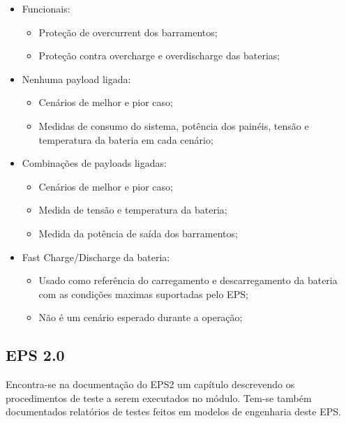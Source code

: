 \begin{itemize}
    \item Funcionais:
    \begin{itemize}
        \item Proteção de overcurrent dos barramentos;
        \item Proteção contra overcharge e overdischarge das baterias;
    \end{itemize}
    \item Nenhuma payload ligada:
    \begin{itemize}
        \item Cenários de melhor e pior caso;
        \item Medidas de consumo do sistema, potência dos painéis, tensão e temperatura da bateria em cada cenário;
    \end{itemize}
    \item Combinações de payloads ligadas:
    \begin{itemize}
        \item Cenários de melhor e pior caso;
        \item Medida de tensão e temperatura da bateria;
        \item Medida da potência de saída dos barramentos;
    \end{itemize}
    \item Fast Charge/Discharge da bateria:
    \begin{itemize}
        \item Usado como referência do carregamento e descarregamento da bateria com as condições maximas suportadas pelo EPS;
        \item Não é um cenário esperado durante a operação;
    \end{itemize}
\end{itemize}



\subsection*{EPS 2.0}

Encontra-se na documentação do \gls{EPS2} \cite{eps2-doc} um capítulo descrevendo os procedimentos de teste a serem executados no módulo.
Tem-se também documentados relatórios de testes feitos em modelos de engenharia deste \gls{EPS}.

